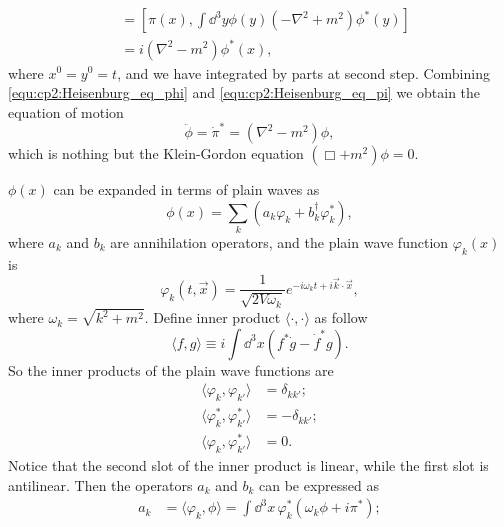 \begin{problembody}
\begin{align}
        & = \left[\pi(x), \int \dd^3y \phi(y)(-\nabla^2 + m^2)\phi^\ast(y)\right]\nonumber\\
        & = i(\nabla^2 - m^2) \phi^\ast(x),
    \end{align}
    where $x^0 = y^0 = t$, and we have integrated by parts at second step. Combining \eqref{equ:cp2:Heisenburg_eq_phi} 
    and \eqref{equ:cp2:Heisenburg_eq_pi} we obtain the equation of motion
    \begin{equation}\label{equ:cp2:csf_equation_of_motion}
        \ddot{\phi} = \dot{\pi}^\ast = (\nabla^2 - m^2)\phi,
    \end{equation}
    which is nothing but the Klein-Gordon equation $(\Box + m^2)\phi = 0$.

    \item $\phi(x)$ can be expanded in terms of plain waves as
    \begin{equation}\label{equ:cp2:phi_expand}
        \phi(x) = \sum_k \left(a_k \varphi_k + b^\dagger_k \varphi^\ast_k \right),
    \end{equation}
    where $a_k$ and $b_k$ are annihilation operators, and the plain wave function $\varphi_k(x)$ is 
    \begin{equation}\label{equ:cp2:plain_w}
        \varphi_k(t, \vec{x}) = \frac{1}{\sqrt{2V\omega_k}}e^{-i\omega_kt + i\vec{k}\cdot\vec{x}},
    \end{equation}
    where $\omega_k = \sqrt{k^2 + m^2}$. Define inner product $\langle\cdot,\cdot\rangle$ as follow
    \begin{equation}\label{equ:cp2:inner_prod}
        \langle f, g \rangle \equiv i \int \dd^3x (f^\ast\dot{g} - \dot{f}^\ast g).
    \end{equation}
    So the inner products of the plain wave functions are
    \begin{align*}
        \langle \varphi_k, \varphi_{k'} \rangle & = \delta_{kk'};\\
        \langle \varphi^\ast_k, \varphi^\ast_{k'} \rangle & = -\delta_{kk'};\\
        \langle \varphi_k, \varphi^\ast_{k'} \rangle & = 0.
    \end{align*}
    Notice that the second slot of the inner product is linear, while the first slot is antilinear. 
    Then the operators $a_k$ and $b_k$ can be expressed as
    \begin{subequations}\label{equ:cp2:csf_optr_a_b}
        \begin{align}
            a_k & = \langle \varphi_k, \phi \rangle = \int \dd^3x \, \varphi^\ast_k \left(\omega_k\phi + i\pi^\ast\right);\\

\end{align}
\end{subequations}
\end{problembody}
